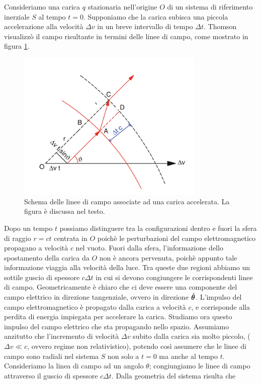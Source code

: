 Consideriamo una carica $q$ stazionaria nell'origine $O$ di un sistema di riferimento inerziale $S$ al tempo $t=0$. Supponiamo che la carica subisca una piccola accelerazione alla velocità $\Delta v$ in un breve intervallo di tempo $\Delta t$. Thomson visualizzò il campo risultante in termini delle linee di campo, come mostrato in figura \ref{fig:Radiazione1}.
\begin{figure}
\begin{center}
\includegraphics[width=0.8\textwidth]{img/CaricaAccelerata}
\caption{Schema delle linee di campo associate ad una carica accelerata. La figura è discussa nel testo.} \label{fig:Radiazione1}
\end{center}
\end{figure}
Dopo un tempo $t$ possiamo distinguere tra la configurazioni dentro e fuori la sfera di raggio $r=ct$ centrata in $O$ poichè le perturbazioni del campo elettromagnetico propagano a velocità $c$ nel vuoto. Fuori dalla sfera, l'informazione dello spostamento della carica da $O$ non è ancora pervenuta, poichè appunto tale informazione viaggia alla velocità della luce. Tra queste due regioni abbiamo un sottile guscio di spessore $c\Delta t$ in cui si devono congiungere le corrispondenti linee di campo. Geometricamente è chiaro che ci deve essere una componente del campo elettrico in direzione tangenziale, ovvero in direzione $\hat{\V{\theta}}$. L'impulso del campo elettromagnetico è propagato dalla carica a velocità $c$, e corrisponde alla perdita di energia impiegata per accelerare la carica. 
Studiamo ora questo impulso del campo elettrico che sta propagando nello spazio. Assumiamo anzitutto che l'incremento di velocità $\Delta v$ subito dalla carica sia molto piccolo, ($\Delta v \ll c$, ovvero regime non relativistico), potendo così assumere che le linee di campo sono radiali nel sistema $S$ non solo a $t=0$ ma anche al tempo $t$. Consideriamo la linea di campo ad un angolo $\theta$; congiungiamo le linee di campo attraverso il guscio di spessore $c\Delta t$. Dalla geometria del sistema risulta che 
